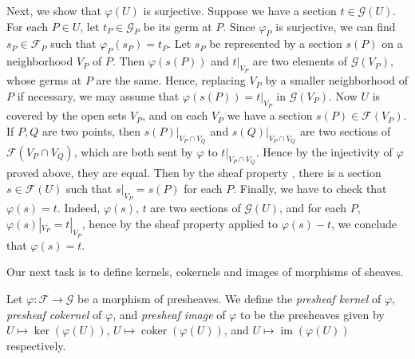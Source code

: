{Next, we show that $\varphi(U)$ is surjective. Suppose we have a section $t\in\mathcal G(U)$. For each $P\in U$, let $t_P\in\mathcal G_P$ be its germ at $P$. Since $\varphi_P$ is surjective, we can find $s_P\in\mathcal F_P$ such that $\varphi_P(s_P)=t_P$. Let $s_P$ be represented by a section $s(P)$ on a neighborhood $V_P$ of $P$. Then $\varphi(s(P))$ and $t|_{V_P}$ are two elements of $\mathcal G(V_P)$, whose germs at $P$ are the same. Hence, replacing $V_P$ by a smaller neighborhood of $P$ if necessary, we may assume that $\varphi(s(P))=t|_{V_P}$ in $\mathcal G(V_P)$. Now $U$ is covered by the open sets $V_P$, and on each $V_P$ we have a section $s(P)\in\mathcal F(V_P)$. If $P,Q$ are two points, then $s(P)|_{V_P\cap V_Q}$ and $s(Q)|_{V_P\cap V_Q}$ are two sections of $\mathcal F(V_P\cap V_Q)$, which are both sent by $\varphi$ to $t|_{V_P\cap V_Q}$. Hence by the injectivity of $\varphi$ proved above, they are equal. Then by the sheaf property , there is a section $s\in\mathcal F(U)$ such that $s|_{V_P}=s(P)$ for each $P$. Finally, we have to check that $\varphi(s)=t$. Indeed, $\varphi(s)$, $t$ are two sections of $\mathcal G(U)$, and for each $P$, $\varphi(s)|_{V_P}=t|_{V_P}$, hence by the sheaf property  applied to $\varphi(s)-t$, we conclude that $\varphi(s)=t$.

\smallskip
Our next task is to define kernels, cokernels and images of morphisms of sheaves.

\Dfn Let $\varphi\colon\mathcal F\to\mathcal G$ be a morphism of presheaves. We define the \emph{presheaf kernel} of $\varphi$, \emph{presheaf cokernel} of $\varphi$, and \emph{presheaf image} of $\varphi$ to be the presheaves given by $U\mapsto\ker(\varphi(U))$, $U\mapsto\operatorname{coker}(\varphi(U))$, and $U\mapsto\operatorname{im}(\varphi(U))$ respectively.
}
